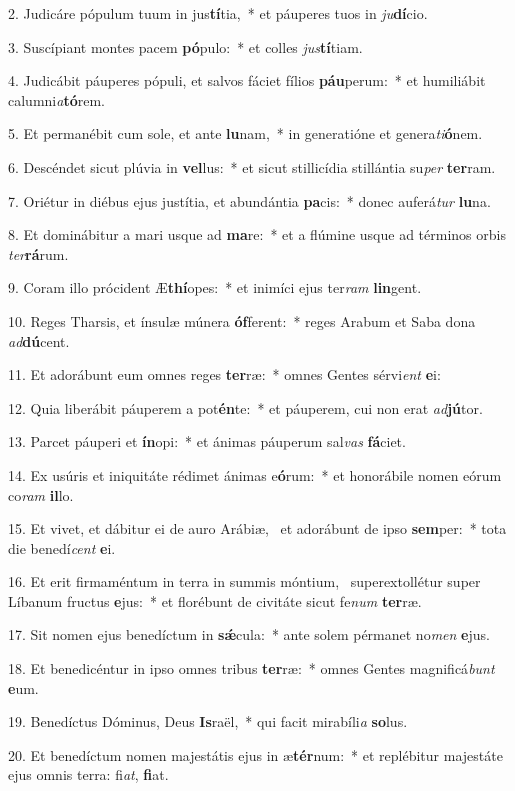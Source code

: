 2. Judicáre pópulum tuum in jus\textbf{tí}tia,~*  et páuperes tuos in \textit{ju}\textbf{dí}cio.\

3. Suscípiant montes pacem \textbf{pó}pulo:~*  et colles \textit{jus}\textbf{tí}tiam.\

4. Judicábit páuperes pópuli, et salvos fáciet fílios \textbf{páu}perum:~*  et humiliábit calumni\textit{a}\textbf{tó}rem.\

5. Et permanébit cum sole, et ante \textbf{lu}nam,~*  in generatióne et genera\textit{ti}\textbf{ó}nem.\

6. Descéndet sicut plúvia in \textbf{vel}lus:~*  et sicut stillicídia stillántia su\textit{per} \textbf{ter}ram.\

7. Oriétur in diébus ejus justítia, et abundántia \textbf{pa}cis:~*  donec auferá\textit{tur} \textbf{lu}na.\

8. Et dominábitur a mari usque ad \textbf{ma}re:~*  et a flúmine usque ad términos orbis \textit{ter}\textbf{rá}rum.\

9. Coram illo prócident Æ\textbf{thí}opes:~*  et inimíci ejus ter\textit{ram} \textbf{lin}gent.\

10. Reges Tharsis, et ínsulæ múnera \textbf{óf}ferent:~*  reges Arabum et Saba dona \textit{ad}\textbf{dú}cent.\

11. Et adorábunt eum omnes reges \textbf{ter}ræ:~*  omnes Gentes sérvi\textit{ent} \textbf{e}i:\

12. Quia liberábit páuperem a pot\textbf{én}te:~*  et páuperem, cui non erat \textit{ad}\textbf{jú}tor.\

13. Parcet páuperi et \textbf{ín}opi:~*  et ánimas páuperum sal\textit{vas} \textbf{fá}ciet.\

14. Ex usúris et iniquitáte rédimet ánimas e\textbf{ó}rum:~*  et honorábile nomen eórum co\textit{ram} \textbf{il}lo.\

15. Et vivet, et dábitur ei de auro Arábiæ, \dag\  et adorábunt de ipso \textbf{sem}per:~*  tota die benedí\textit{cent} \textbf{e}i.\

16. Et erit firmaméntum in terra in summis móntium, \dag\  superextollétur super Líbanum fructus \textbf{e}jus:~*  et florébunt de civitáte sicut fe\textit{num} \textbf{ter}ræ.\

17. Sit nomen ejus benedíctum in \textbf{sǽ}cula:~*  ante solem pérmanet no\textit{men} \textbf{e}jus.\

18. Et benedicéntur in ipso omnes tribus \textbf{ter}ræ:~*  omnes Gentes magnificá\textit{bunt} \textbf{e}um.\

19. Benedíctus Dóminus, Deus \textbf{Is}raël,~*  qui facit mirabíli\textit{a} \textbf{so}lus.\

20. Et benedíctum nomen majestátis ejus in æ\textbf{tér}num:~*  et replébitur majestáte ejus omnis terra: fi\textit{at}, \textbf{fi}at.\

